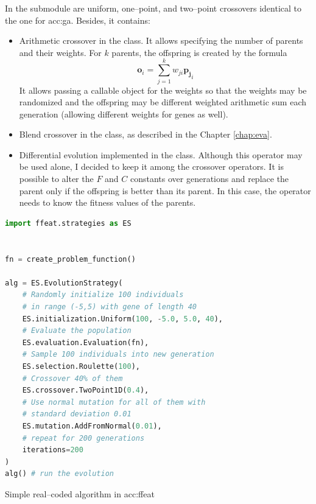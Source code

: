 In the  submodule are uniform, one--point, and two--point crossovers identical to the one for \acrshort{acc:ga}. Besides, it contains:
\begin{itemize}
    \item Arithmetic crossover in the  class. It allows specifying the number of parents and their weights. For $k$ parents, the offspring is created by the formula 
    $$\mathbf{o}_i=\sum_{j=1}^k w_{ji}\mathbf{p_j}_i$$
    It allows passing a callable object for the weights so that the weights may be randomized and the offspring may be different weighted arithmetic sum each generation (allowing different weights for genes as well).
    \item Blend crossover in the  class, as described in the Chapter \ref{chap:eva}.
    \item Differential evolution implemented in the  class. Although this operator may be used alone, I decided to keep it among the crossover operators. It is possible to alter the $F$ and $C$ constants over generations and replace the parent only if the offspring is better than its parent. In this case, the operator needs to know the fitness values of the parents.
\end{itemize}

\begin{algorithm}[b!]
\begin{lstlisting}[language=Python, xrightmargin=18pt]
import ffeat.strategies as ES


fn = create_problem_function()

alg = ES.EvolutionStrategy(
    # Randomly initialize 100 individuals 
    # in range (-5,5) with gene of length 40
    ES.initialization.Uniform(100, -5.0, 5.0, 40),
    # Evaluate the population
    ES.evaluation.Evaluation(fn),
    # Sample 100 individuals into new generation
    ES.selection.Roulette(100),
    # Crossover 40% of them
    ES.crossover.TwoPoint1D(0.4),
    # Use normal mutation for all of them with 
    # standard deviation 0.01
    ES.mutation.AddFromNormal(0.01),
    # repeat for 200 generations
    iterations=200
)
alg() # run the evolution
\end{lstlisting}
\caption{Simple real--coded algorithm in \acrshort*{acc:ffeat}}
\label{alg:esffeat}
\end{algorithm}


